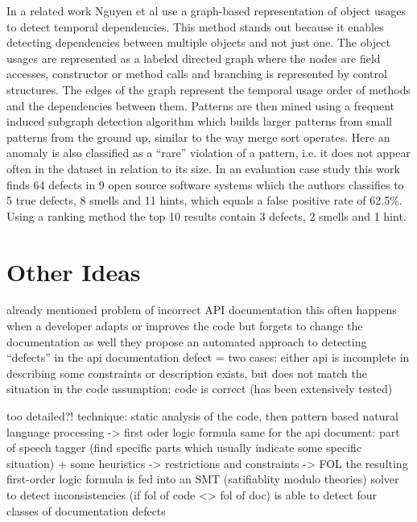 In a related work Nguyen et al \cite{nguyen2009graph} use a graph-based representation of object usages to detect temporal dependencies.
This method stands out because it enables detecting dependencies between multiple objects and not just one.
The object usages are represented as a labeled directed graph where the nodes are field accesses, constructor or method calls and branching is represented by control structures.
The edges of the graph represent the temporal usage order of methods and the dependencies between them.
Patterns are then mined using a frequent induced subgraph detection algorithm which builds larger patterns from small patterns from the ground up, similar to the way merge sort operates.
Here an anomaly is also classified as a ``rare'' violation of a pattern, i.e. it does not appear often in the dataset in relation to its size.
In an evaluation case study this work finds 64 defects in 9 open source software systems which the authors classifies to 5 true defects, 8 smells and 11 hints, which equals a false positive rate of 62.5\%.
Using a ranking method the top 10 results contain 3 defects, 2 smells and 1 hint.


\section{Other Ideas}

\cite{zhou2017analyzing}
already mentioned problem of incorrect API documentation
this often happens when a developer adapts or improves the code but forgets to change the documentation as well
they propose an automated approach to detecting ``defects'' in the api documentation
defect = two cases: either api is incomplete in describing some constraints
or description exists, but does not match the situation in the code
assumption: code is correct (has been extensively tested)

too detailed?!
technique: static analysis of the code, then pattern based natural language processing -> first oder logic formula
same for the api document: part of speech tagger (find specific parts which usually indicate some specific situation) + some heuristics -> restrictions and constraints -> FOL
the resulting first-order logic formula is fed into an SMT (satifiablity modulo theories) solver \cite{barrett2009satisfiability} to detect inconsistencies (if fol of code <> fol of doc)
is able to detect four classes of documentation defects

